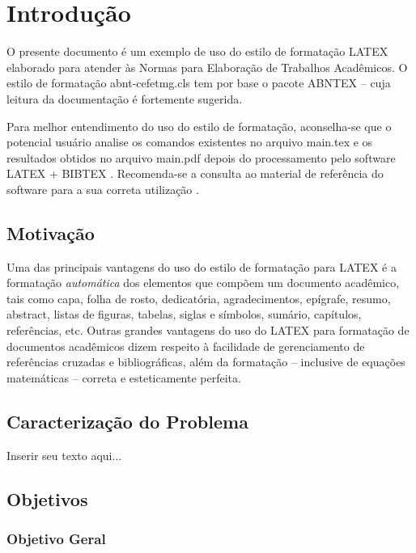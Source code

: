 %
%

\chapter{Introdução}\label{chap:introducao}

O presente documento é um exemplo de uso do estilo de formatação LATEX elaborado para atender às Normas para Elaboração de Trabalhos Acadêmicos. O estilo de formatação {\ttfamily abnt-cefetmg.cls} tem por base o pacote ABNTEX -- cuja leitura da documentação \cite{abnTeX2009} é fortemente sugerida.

Para melhor entendimento do uso do estilo de formatação, aconselha-se que o potencial usuário analise os comandos existentes no arquivo {\ttfamily main.tex} e os resultados obtidos no arquivo {\ttfamily main.pdf} depois do processamento pelo software LATEX + BIBTEX \cite{LaTeX2009,BibTeX2009}. Recomenda-se a consulta ao material de referência do software para a sua correta utilização \cite{Lamport1986,Buerger1989,Kopka2003,Mittelbach2004}.

\section{Motivação}
\label{sec:motivacao}

Uma das principais vantagens do uso do estilo de formatação para LATEX é a formatação \textit{automática} dos elementos que compõem um documento acadêmico, tais como capa, folha de rosto, dedicatória, agradecimentos, epígrafe, resumo, abstract, listas de figuras, tabelas, siglas e símbolos, sumário, capítulos, referências, etc. Outras grandes vantagens do uso do LATEX para formatação de documentos acadêmicos dizem respeito à facilidade de gerenciamento de referências cruzadas e bibliográficas, além da formatação -- inclusive de equações  matemáticas -- correta e esteticamente perfeita.

\section{Caracterização do Problema}
\label{sec:caracProblema}

Inserir seu texto aqui...

\section{Objetivos}
\label{sec:objetivos}

\subsection{Objetivo Geral}
\label{subsec:objetivoGeral}

